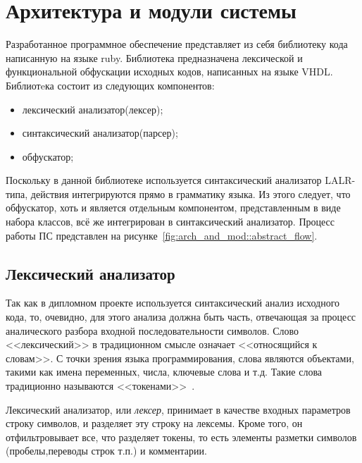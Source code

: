 
\section{Архитектура и модули системы} %
\label{sec:arch_and_mod}

Разработанное программное обеспечение представляет из себя библиотеку кода написанную на языке ruby.
Библиотека предназначена лексической и функциональной обфускации исходных кодов, написанных на языке VHDL.
Библиотeка состоит из следующих компонентов:
\begin{itemize}
\item лексический анализатор(лексер);
\item синтаксический анализатор(парсер);
\item обфускатор;
\end{itemize}
Поскольку в данной библиотеке используется синтаксический анализатор LALR-типа, действия интегрируются прямо в грамматику языка. Из этого следует, что обфускатор, хоть и является отдельным компонентом, представленным в виде набора классов, всё же интегрирован в синтаксический анализатор. Процесс работы ПС представлен на рисунке~\ref{fig:arch_and_mod::abstract_flow}.

\subsection{Лексический анализатор}
\label{sub:arch_and_mod:lexer}

Так как в дипломном проекте используется синтаксический анализ исходного кода, то, очевидно, для этого анализа должна быть часть, отвечающая за процесс аналического разбора входной последовательности символов. Слово <<лексический>> в традиционном смысле означает <<относящийся к словам>>. С точки зрения языка программирования, слова являются объектами, такими как имена переменных, числа, ключевые слова и т.д. Такие слова традиционно называются <<токенами>>~\cite{basic_compiler_design}.

Лексический анализатор, или \textit{лексер}, принимает в качестве входных параметров строку символов, и разделяет эту строку на лексемы. Кроме того, он отфильтровывает все, что разделяет токены, то есть элементы разметки символов (пробелы,переводы строк т.п.) и комментарии.

